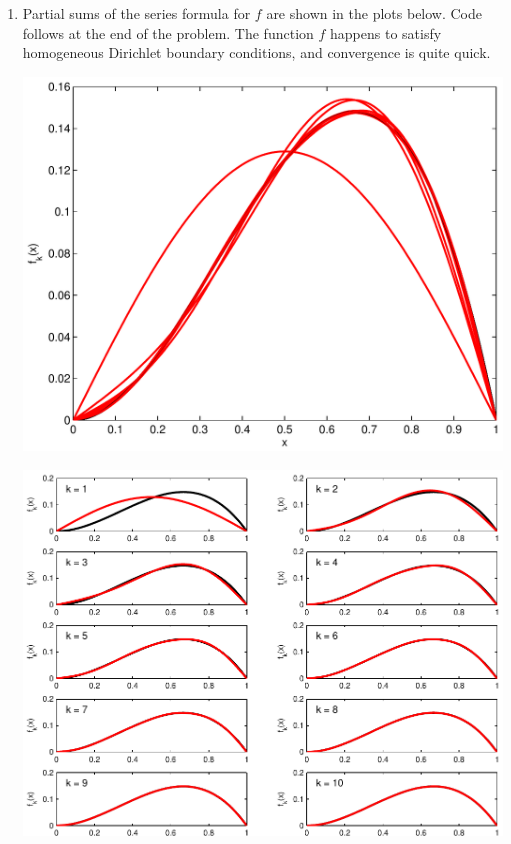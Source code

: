 \begin{solution}
\begin{enumerate}
    \item Partial sums of the series formula for $f$ are shown in the plots below.
          Code follows at the end of the problem.  The function $f$ happens to 
          satisfy homogeneous Dirichlet boundary conditions, and convergence is
          quite quick.
          \begin{center}\includegraphics[scale=0.45]{sineseries2b}\end{center}
          \begin{center}\includegraphics[scale=0.7]{sineseries2c}\end{center}
         

\end{enumerate}
\end{solution}
